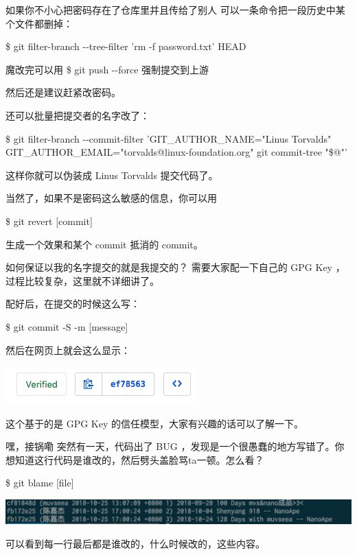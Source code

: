 \documentclass{beamer}
\begin{document}
\begin{frame}{如果你不小心把密码存在了仓库里并且传给了别人}
    可以一条命令把一段历史中某个文件都删掉：

    \$ git filter-branch -{}-tree-filter 'rm -f password.txt' HEAD

    魔改完可以用 \$ git push -{}-force 强制提交到上游

    然后还是建议赶紧改密码。

    还可以批量把提交者的名字改了：

    \$ git filter-branch -{}-commit-filter 'GIT\_AUTHOR\_NAME="Linus Torvalds" GIT\_AUTHOR\_EMAIL="torvalds@linux-foundation.org" git commit-tree "\$@"'

    这样你就可以伪装成 Linus Torvalds 提交代码了。

    当然了，如果不是密码这么敏感的信息，你可以用

    \$ git revert [commit]

    生成一个效果和某个 commit 抵消的 commit。
\end{frame}

\begin{frame}{如何保证以我的名字提交的就是我提交的？}
    需要大家配一下自己的 GPG Key ，过程比较复杂，这里就不详细讲了。

    配好后，在提交的时候这么写：

    \$ git commit -S -m [message]

    然后在网页上就会这么显示：

    \includegraphics[width=\linewidth]{2018-10-26-20-16-02.png}

    这个基于的是 GPG Key 的信任模型，大家有兴趣的话可以了解一下。
\end{frame}

\begin{frame}{嘿，接锅嘞}
    突然有一天，代码出了 BUG ，发现是一个很愚蠢的地方写错了。你想知道这行代码是谁改的，然后劈头盖脸骂ta一顿。怎么看？

    \$ git blame [file]

    \includegraphics[width=\linewidth]{2018-10-27-00-12-08.png}

    可以看到每一行最后都是谁改的，什么时候改的，这些内容。
\end{frame}
\end{document}
